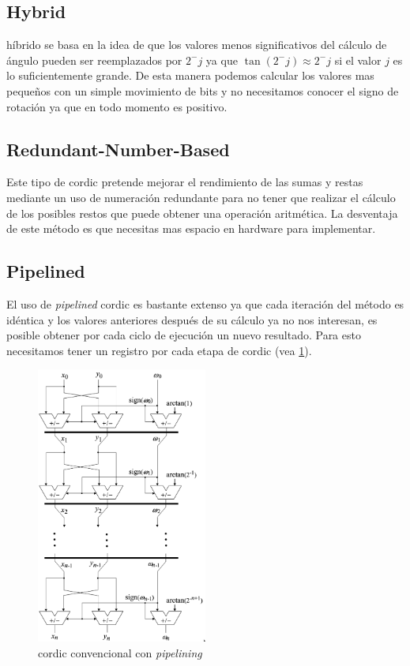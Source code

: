 \subsection{Hybrid }
 híbrido se basa en la idea de que los valores menos significativos del cálculo de ángulo pueden ser reemplazados por $2^-j$ ya que $\tan(2^-j) \approx 2^-j $ si el valor $j$ es lo suficientemente grande. De esta manera podemos calcular los valores mas pequeños con un simple movimiento de bits y no necesitamos conocer el signo de rotación ya que en todo momento es positivo. \cite{wang_hybrid_1997}

\subsection{Redundant-Number-Based }
Este tipo de \gls{cordic} pretende mejorar el rendimiento de las sumas y restas mediante un uso de numeración redundante para no tener que realizar el cálculo de los posibles restos que puede obtener una operación aritmética. La desventaja de este método es que necesitas mas espacio en hardware para implementar. \cite{noauthor_redundant_nodate}

\subsection{Pipelined }
El uso de \textit{pipelined} \gls{cordic} es bastante extenso ya que cada iteración del método es idéntica y los valores anteriores después de su cálculo ya no nos interesan, es posible obtener por cada ciclo de ejecución un nuevo resultado. Para esto necesitamos tener un registro por cada etapa de \gls{cordic} (vea \ref{graf:2009-CORDIC_pipelined}).

\begin{figure}[ht]
	\centering
	\includegraphics[width=0.50\textwidth]{archivos/CORDIC/2009-CORDIC_pipelined.png}
	\caption{\gls{cordic} convencional con \textit{pipelining}}
	\label{graf:2009-CORDIC_pipelined}
\end{figure}


